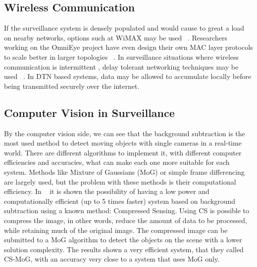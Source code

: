\documentclass[journal,transmag]{IEEEtran}
\begin{document}
\subsection{Wireless Communication}
If the surveillance system is densely populated and would cause to great a load on nearby networks, options such at WiMAX may be used ~\cite{HuSIMS}. 
Researchers working on the OmniEye project have even design their own MAC layer protocols to scale better in larger topologies ~\cite{OmniEye}. In surveillance 
situations where wireless communication is intermittent , delay tolerant networking techniques may be used ~\cite{DTNSmartCamera}. In DTN based systems, data
may be allowed to accumulate locally before being transmitted securely over the internet.


\subsection{Computer Vision in Surveillance}
By the computer vision side, we can see that the background subtraction is the most used method to detect moving objects with single cameras in a 
real-time world. There are different algorithms to implement it, with different computer efficiencies and accuracies, what can make each one more
suitable for each system. Methods like Mixture of Gaussians (MoG) or simple frame differencing are largely used, but the problem with these methods is
their computational efficiency. In ~\cite{CS-MoG} it is shown the possibility of having a low power and computationally efficient (up to 5 times
faster) system based on background subtraction using a known method: Compressed Sensing. Using CS is possible to compress the image, in other words,
reduce the amount of data to be processed, while retaining much of the original image. The compressed image can be submitted to a MoG algorithm to
detect the objects on the scene with a lower solution complexity. The results shown a very efficient system, that they called CS-MoG, with an accuracy
very close to a system that uses MoG only.
\end{document}
